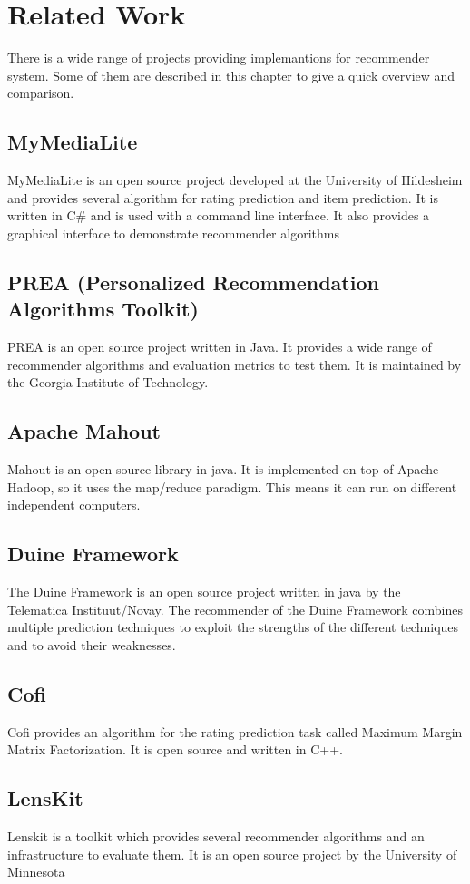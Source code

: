 
\chapter{Related Work}

There is a wide range of projects providing implemantions for recommender
system. Some of them are described in this chapter to give a quick
overview and comparison.


\section{MyMediaLite}

MyMediaLite\cite{Gantner2011MyMediaLite} is an open source project developed at the
University of Hildesheim and provides several algorithm for rating
prediction and item prediction. It is written in C\# and is used with
a command line interface. It also provides a graphical interface to
demonstrate recommender algorithms


\section{PREA (Personalized Recommendation Algorithms Toolkit)}

PREA\cite{2012arXiv1205.3193L} is an open source project written in Java. It provides
a wide range of recommender algorithms and evaluation metrics to test
them. It is maintained by the Georgia Institute of Technology.


\section{Apache Mahout}

Mahout\cite{mahout} is an open source library in java. It is implemented
on top of Apache Hadoop, so it uses the map/reduce paradigm. This
means it can run on different independent computers.


\section{Duine Framework}

The Duine Framework \cite{duine} is an open source project written
in java by the Telematica Instituut/Novay. The recommender of the
Duine Framework combines multiple prediction techniques to exploit
the strengths of the different techniques and to avoid their weaknesses.


\section{Cofi}

Cofi \cite{cofi}provides an algorithm for the rating prediction
task called Maximum Margin Matrix Factorization. It is open source
and written in C++.


\section{LensKit}

Lenskit \cite{Ekstrand:2011:RRR:2043932.2043958} is a toolkit which provides several recommender
algorithms and an infrastructure to evaluate them. It is an open source
project by the University of Minnesota
